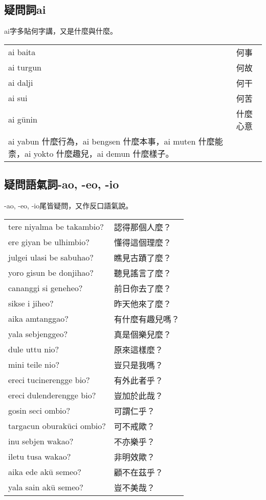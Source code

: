 \documentclass{article}
\begin{document}
\subsection{疑問詞ai}
\noindent ai字多貼何字講，又是什麼與什麼。
\begin{center}
    \begin{tabularx}{\textwidth}{XX}
     ai baita& 何事\\ai turgun&何故\\ai dalji&何干\\ai sui&何苦\\ai g\={u}nin&什麼心意\\ai yabun 什麼行為，ai bengsen 什麼本事，ai muten 什麼能柰，ai yokto 什麼趣兒，ai demun 什麼樣子。
    \end{tabularx}
\end{center}

\subsection{疑問語氣詞-ao, -eo, -io}
\noindent -ao, -eo, -io尾皆疑問，又作反口語氣說。
\begin{center}
    \begin{tabularx}{\textwidth}{XX}
     tere niyalma be takambio? &認得那個人麼？\\
     ere giyan be ulhimbio?& 懂得這個理麼？\\
     julgei ulasi be sabuhao? &瞧見古蹟了麼？\\
     yoro gisun be donjihao? &聽見謠言了麼？\\
     cananggi si geneheo? &前日你去了麼？\\
     sikse i jiheo? &昨天他來了麼？\\
     aika amtanggao? &有什麼有趣兒嗎？\\
     yala sebjenggeo? &真是個樂兒麼？\\
     dule uttu nio? &原來這樣麼？\\
     mini teile nio? &豈只是我嗎？\\
     ereci tucinerengge bio? &有外此者乎？\\
     ereci dulenderengge bio? &豈加於此哉？\\
     gosin seci ombio? &可謂仁乎？\\
     targacun oburak\={u}ci ombio? &可不戒歟？\\
     inu sebjen wakao? &不亦樂乎？\\
     iletu tusa wakao? &非明效歟？\\
     aika ede ak\={u} semeo? &顧不在茲乎？\\
     yala sain ak\={u} semeo? &豈不美哉？
    \end{tabularx}
\end{center}
\end{document}
